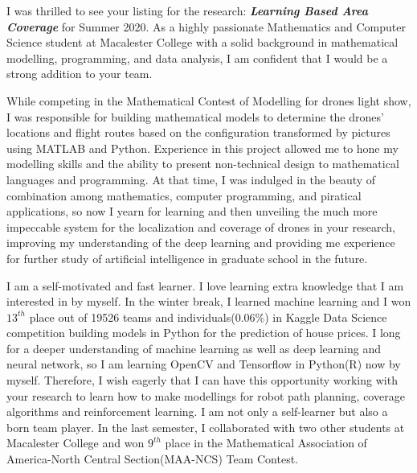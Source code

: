 \documentclass[11pt, a4paper]{awesome-cv}
\begin{document}
\makecvheader[L]


\makelettertitle

\begin{cvletter}
I was thrilled to see your listing for the research: \textit{\textbf{Learning Based Area Coverage}} for Summer 2020. As a highly passionate Mathematics and Computer Science student at Macalester College with a solid background in mathematical modelling, programming, and data analysis, I am confident that I would be a strong addition to your team.


While competing in the Mathematical Contest of Modelling for drones light show, I was responsible for building mathematical models to determine the drones' locations and flight routes based on the configuration transformed by pictures using MATLAB and Python. Experience in this project allowed me to hone my modelling skills and the ability to present non-technical design to mathematical languages and programming. At that time, I was indulged in the beauty of combination among mathematics, computer programming, and piratical applications, so now I yearn for learning and then unveiling the much more impeccable system for the localization and coverage of drones in your research, improving my understanding of the deep learning and providing me experience for further study of artificial intelligence in graduate school in the future. 


I am a self-motivated and fast learner. I love learning extra knowledge that I am interested in by myself. In the winter break, I learned machine learning and I won $13^{th}$ place out of 19526 teams and individuals(0.06\%) in Kaggle Data Science competition building models in Python for the prediction of house prices. I long for a deeper understanding of machine learning as well as deep learning and neural network, so I am learning OpenCV and Tensorflow in Python(R) now by myself. Therefore, I wish eagerly that I can have this opportunity working with your research to learn how to make modellings for robot path planning, coverage algorithms and reinforcement learning. I am not only a self-learner but also a born team player. In the last semester, I collaborated with two other students at Macalester College and won $9^{th}$ place in the Mathematical Association of America-North Central Section(MAA-NCS) Team Contest.






\end{cvletter}
\end{document}
